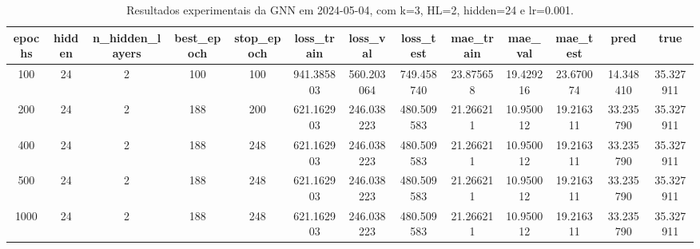 \begin{table}[h]
\centering
\caption{Resultados experimentais da GNN em 2024-05-04, com k=3, HL=2, hidden=24 e lr=0.001.}
\label{tab:gnn_results_k3_hl2_h24_d20240504}
\begin{tabular}{ccccccccccccc}
\toprule
epochs & hidden & n\_hidden\_layers & best\_epoch & stop\_epoch & loss\_train & loss\_val & loss\_test & mae\_train & mae\_val & mae\_test & pred & true \\
\midrule
100 & 24 & 2 & 100 & 100 & 941.385803 & 560.203064 & 749.458740 & 23.875658 & 19.429216 & 23.670074 & 14.348410 & 35.327911 \\
200 & 24 & 2 & 188 & 200 & 621.162903 & 246.038223 & 480.509583 & 21.266211 & 10.950012 & 19.216311 & 33.235790 & 35.327911 \\
400 & 24 & 2 & 188 & 248 & 621.162903 & 246.038223 & 480.509583 & 21.266211 & 10.950012 & 19.216311 & 33.235790 & 35.327911 \\
500 & 24 & 2 & 188 & 248 & 621.162903 & 246.038223 & 480.509583 & 21.266211 & 10.950012 & 19.216311 & 33.235790 & 35.327911 \\
1000 & 24 & 2 & 188 & 248 & 621.162903 & 246.038223 & 480.509583 & 21.266211 & 10.950012 & 19.216311 & 33.235790 & 35.327911 \\
\bottomrule
\end{tabular}
\end{table}
